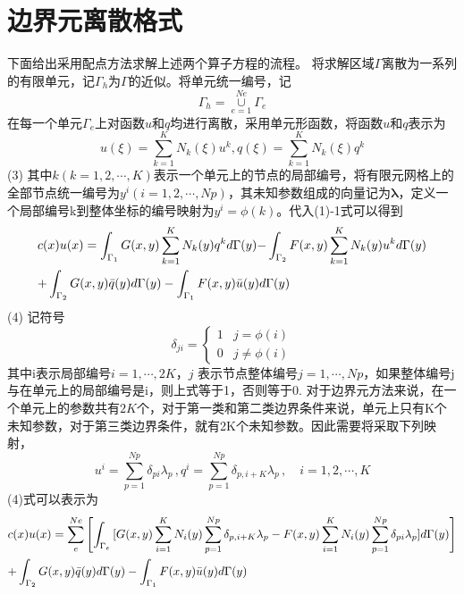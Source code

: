 \section{边界元离散格式}
下面给出采用配点方法求解上述两个算子方程的流程。
将求解区域$\Gamma $离散为一系列的有限单元，记${\Gamma _h}$为$\Gamma $的近似。将单元统一编号，记
\[
{\Gamma _h} = \mathop  \cup \limits_{e = 1}^{Ne} {\Gamma _e}
\]
在每一个单元${\Gamma _e}$上对函数$u$和$q$均进行离散，采用单元形函数，将函数$u$和$q$表示为
	\[u(\xi ) = \sum\limits_{k = 1}^K {{N_k}(\xi ){u^k}} ,q(\xi ) = \sum\limits_{k = 1}^K {{N_k}(\xi ){q^k}} \]	(3)
其中$k$$(k = 1,2, \cdots ,K)$表示一个单元上的节点的局部编号，将有限元网格上的全部节点统一编号为${y^i}$$(i = 1,2, \cdots ,Np)$，其未知参数组成的向量记为$\mathbf{\lambda }$，定义一个局部编号k到整体坐标的编号映射为${y^i} = \phi (k)$。代入(1)-1式可以得到
	\[\begin{gathered}
  c(x)u(x) = \int_{{\Gamma _1}}^{} {G(x,y)\sum\limits_{k = 1}^K {{N_k}(y){q^k}} d\Gamma (y) - } \int_{{\Gamma _2}}^{} {F(x,y)\sum\limits_{k = 1}^K {{N_k}(y){u^k}} d\Gamma (y)}  \hfill \\
   + \int_{{\Gamma _2}}^{} {G(x,y)\bar q(y)d\Gamma (y) - \int_{{\Gamma _1}}^{} {F(x,y)\bar u(y)d\Gamma (y)} }  \hfill \\ 
\end{gathered} \]	(4)
记符号
\[{\delta _{ji}} = \left\{ {\begin{array}{*{20}{c}}
  1&{j = \phi (i)} \\ 
  0&{j \ne \phi (i)} 
\end{array}} \right.\]其中i表示局部编号$i = 1, \cdots ,2K$，$j$ 表示节点整体编号$j = 1, \cdots ,Np$，如果整体编号j与在单元上的局部编号是i，则上式等于1，否则等于0.
对于边界元方法来说，在一个单元上的参数共有$2K$个，对于第一类和第二类边界条件来说，单元上只有K个未知参数，对于第三类边界条件，就有2K个未知参数。因此需要将采取下列映射，
\[
{u^i} = \sum\limits_{p = 1}^{Np} {{\delta _{pi}}{\lambda _p}}\,,
{q^i} = \sum\limits_{p = 1}^{Np} {{\delta _{p,i + K}}{\lambda _p}}\,,\quad i = 1,2, \cdots ,K
\]
(4)式可以表示为
\[\begin{gathered}
  c(x)u(x) = \sum\limits_e^{Ne} {\left[ {\int_{{\Gamma _e}}^{} {[G(x,y)\sum\limits_{i = 1}^K {{N_i}(y)\sum\limits_{p = 1}^{Np} {{\delta _{p,i + K}}{\lambda _p}} }  - F(x,y)\sum\limits_{i = 1}^K {{N_i}(y)\sum\limits_{p = 1}^{Np} {{\delta _{pi}}{\lambda _p}} } ]d\Gamma (y)} } \right]}  \hfill \\
   + \int_{{\Gamma _2}}^{} {G(x,y)\bar q(y)d\Gamma (y) - \int_{{\Gamma _1}}^{} {F(x,y)\bar u(y)d\Gamma (y)} }  \hfill \\ 
\end{gathered} \]
